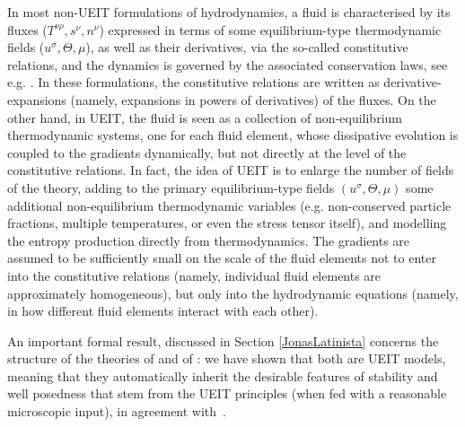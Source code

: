\documentclass[a4paper, amsfonts, amssymb, amsmath, reprint, twocolumn, showkeys, nofootinbib]{revtex4-2}
\begin{document}
In most non-UEIT formulations of hydrodynamics, a fluid is characterised by its fluxes ($T^{\nu \rho},s^\nu,n^\nu$) expressed in terms of some equilibrium-type thermodynamic fields ($u^\sigma,\Theta,\mu$), as well as their derivatives, via the so-called constitutive relations, and the dynamics is governed by the associated conservation laws, see e.g. \citet{kovtun_lectures_2012}. 
In these formulations, the constitutive relations are written as derivative-expansions (namely, expansions in powers of derivatives) of the fluxes. 
%
On the other hand, in UEIT, the fluid is seen as  a collection  of non-equilibrium thermodynamic systems, one for each fluid element, whose dissipative evolution is coupled to the gradients dynamically, but not directly at the level of the constitutive relations. In fact, the idea of UEIT is to enlarge the number of fields of the theory, adding to the primary equilibrium-type fields $(u^\sigma,\Theta,\mu)$ some additional non-equilibrium thermodynamic variables (e.g. non-conserved particle fractions, multiple temperatures, or even the stress tensor itself), and modelling the entropy production directly from thermodynamics. The gradients are assumed to be sufficiently small on the scale of the fluid elements not to enter into the constitutive relations (namely, individual fluid elements are approximately homogeneous), but only into the hydrodynamic equations (namely, in how different fluid elements interact with each other).  

An important formal result, discussed in Section \ref{JonasLatinista} concerns the structure of the theories of \citet{Israel_Stewart_1979} and  of \citet{carter1991}: we have shown that both are UEIT models, meaning that  they automatically inherit the desirable features of stability and well posedness that stem from the UEIT principles (when fed with a reasonable microscopic input), in agreement with~\citet{PriouCOMPAR1991}.
\end{document}
